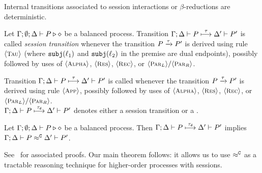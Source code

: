 \documentclass[a4paper,UKenglish]{lipics}
\theoremstyle{definition}
\begin{document}
 
\noi Internal transitions associated to session interactions or  
$\beta$-reductions are deterministic.  
		
\begin{definition}\myrm
\label{def:dettrans}
	Let  $\Gamma; \emptyset; \Delta \vdash P \triangleright \diamond$ be a balanced \HOp process. 
	Transition $\Gamma; \Delta \vdash P \stackrel{\tau}{\longmapsto} \Delta' \vdash P'$ is called
		{\em session transition} whenever the   transition $P \xrightarrow{\tau} P'$ 
		is derived using 
			rule~$\ltsrule{Tau}$ 
		(where $\mathtt{subj}(\ell_1)$ and $\mathtt{subj}(\ell_2)$ in the premise 
		are dual endpoints), 
		possibly followed by uses of  $\ltsrule{Alpha}$, $\ltsrule{Res}$, $\ltsrule{Rec}$, or $\ltsrule{Par${}_L$}/
		\ltsrule{Par${}_R$}$.
		
		Transition $\Gamma; \Delta \vdash P \stackrel{\tau}{\longmapsto} \Delta' \vdash P'$ is called
			{\em \betatran}	whenever the   transition $P \xrightarrow{\tau} P'$
			is derived using rule $\ltsrule{App}$,
			possibly followed by uses of  $\ltsrule{Alpha}$, $\ltsrule{Res}$, $\ltsrule{Rec}$, or $\ltsrule{Par${}_L$}/
		\ltsrule{Par${}_R$}$. \\
%
	 $\Gamma; \Delta \vdash P \stackrel{\tau_{\mathsf{d}}}{\longmapsto} \Delta' \vdash P'$ denotes
	either a session transition or a \betatran.
\end{definition}

\begin{proposition}\myrm
	\label{lem:tau_inert}
Let  $\Gamma; \emptyset; \Delta \vdash P \triangleright \diamond$ be a balanced \HOp process.
	Then
$\Gamma; \Delta \vdash P \stackrel{\tau_{\mathsf{d}}}{\longmapsto} \Delta' \vdash P'$ implies
			$\Gamma; \Delta \vdash P \approx^\mathtt{C} \Delta' \vdash P'$.
\end{proposition}
\noi 
See~\cite{KouzapasPY15} for associated proofs. 
Our main theorem follows: %
it allows us to use $\approx^\mathtt{C}$ as a tractable reasoning %
technique for higher-order processes with sessions.
\end{document}
